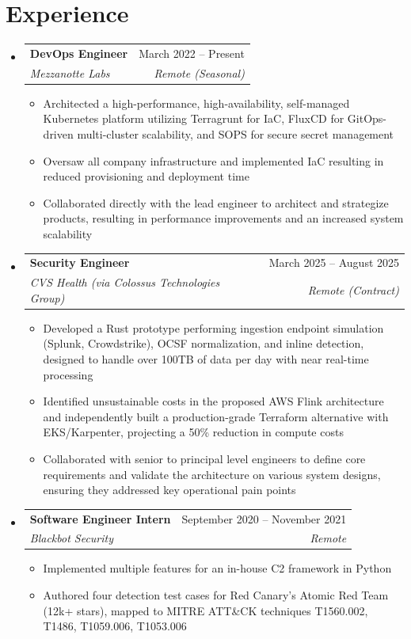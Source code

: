 \documentclass[letterpaper,11pt]{article}
\makeatletter
\newcommand{\resumeItem}[1]{
  \item\small{
    {#1 \vspace{-2pt}}
  }
}
\newcommand{\resumeSubheading}[4]{
  \vspace{-2pt}\item
    \begin{tabular*}{0.97\textwidth}[t]{l@{\extracolsep{\fill}}r}
      \textbf{#1} & #2 \\
      \textit{\small#3} & \textit{\small #4} \\
    \end{tabular*}\vspace{-7pt}
}
\newcommand{\resumeSubHeadingListStart}{\begin{itemize}[leftmargin=0in, label={}]}
\newcommand{\resumeSubHeadingListEnd}{\end{itemize}}
\newcommand{\resumeItemListStart}{\begin{itemize}}
\newcommand{\resumeItemListEnd}{\end{itemize}\vspace{-5pt}}
\makeatother
\begin{document}
\section{Experience}
  \resumeSubHeadingListStart
    \resumeSubheading
      {DevOps Engineer}{March 2022 -- Present}
      {Mezzanotte Labs}{Remote (Seasonal)}
      \resumeItemListStart
        \resumeItem{Architected a high-performance, high-availability, self-managed Kubernetes platform utilizing Terragrunt for IaC, FluxCD for GitOps-driven multi-cluster scalability, and SOPS for secure secret management}
        \resumeItem{Oversaw all company infrastructure and implemented IaC resulting in reduced provisioning and deployment time}
        \resumeItem{Collaborated directly with the lead engineer to architect and strategize products, resulting in performance improvements and an increased system scalability}
      \resumeItemListEnd

    \resumeSubheading
      {Security Engineer}{March 2025 -- August 2025}
      {CVS Health (via Colossus Technologies Group)}{Remote (Contract)}
      \resumeItemListStart
        \resumeItem{Developed a Rust prototype performing ingestion endpoint simulation (Splunk, Crowdstrike), OCSF normalization, and inline detection, designed to handle over 100TB of data per day with near real-time processing}
        \resumeItem{Identified unsustainable costs in the proposed AWS Flink architecture and independently built a production-grade Terraform alternative with EKS/Karpenter, projecting a 50\% reduction in compute costs}
        \resumeItem{Collaborated with senior to principal level engineers to define core requirements and validate the architecture on various system designs, ensuring they addressed key operational pain points}
      \resumeItemListEnd

    \resumeSubheading
      {Software Engineer Intern}{September 2020 -- November 2021}
      {Blackbot Security}{Remote}
      \resumeItemListStart
        \resumeItem{Implemented multiple features for an in-house C2 framework in Python}
        \resumeItem{Authored four detection test cases for Red Canary's Atomic Red Team (12k+ stars), mapped to MITRE ATT\&CK techniques T1560.002, T1486, T1059.006, T1053.006}
    \resumeItemListEnd
  \resumeSubHeadingListEnd

\end{document}
